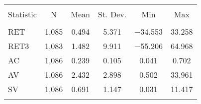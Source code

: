 
\begin{table}[!htbp] \centering 
  \caption{} 
  \label{} 
\begin{tabular}{@{\extracolsep{5pt}}lccccc} 
\\[-1.8ex]\hline 
\hline \\[-1.8ex] 
Statistic & \multicolumn{1}{c}{N} & \multicolumn{1}{c}{Mean} & \multicolumn{1}{c}{St. Dev.} & \multicolumn{1}{c}{Min} & \multicolumn{1}{c}{Max} \\ 
\hline \\[-1.8ex] 
RET & 1,085 & 0.494 & 5.371 & $-$34.553 & 33.258 \\ 
RET3 & 1,083 & 1.482 & 9.911 & $-$55.206 & 64.968 \\ 
AC & 1,086 & 0.239 & 0.105 & 0.041 & 0.702 \\ 
AV & 1,086 & 2.432 & 2.898 & 0.502 & 33.961 \\ 
SV & 1,086 & 0.691 & 1.147 & 0.031 & 11.417 \\ 
\hline \\[-1.8ex] 
\end{tabular} 
\end{table} 
